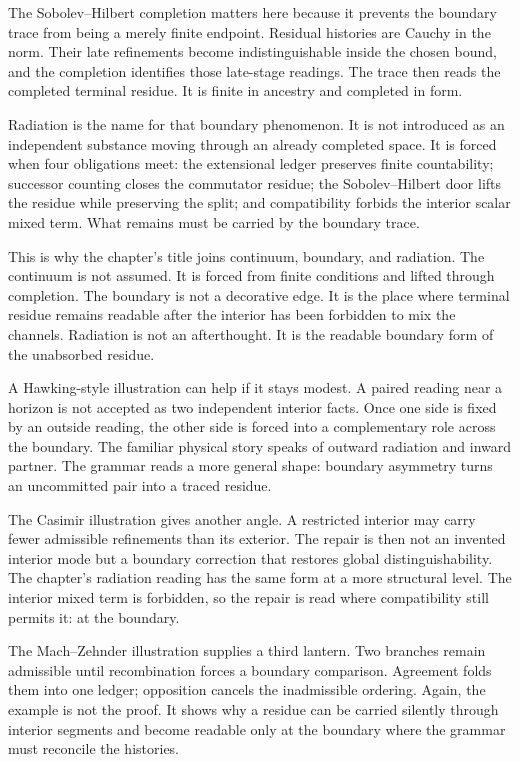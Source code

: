 The Sobolev--Hilbert completion matters here because it prevents the boundary
trace from being a merely finite endpoint. Residual histories are Cauchy in
the norm. Their late refinements become indistinguishable inside the chosen
bound, and the completion identifies those late-stage readings. The trace
then reads the completed terminal residue. It is finite in ancestry and
completed in form.

Radiation is the name for that boundary phenomenon. It is not introduced as
an independent substance moving through an already completed space. It is
forced when four obligations meet: the extensional ledger preserves finite
countability; successor counting closes the commutator residue; the
Sobolev--Hilbert door lifts the residue while preserving the split; and
compatibility forbids the interior scalar mixed term. What remains must be
carried by the boundary trace.

This is why the chapter's title joins continuum, boundary, and radiation.
The continuum is not assumed. It is forced from finite conditions and lifted
through completion. The boundary is not a decorative edge. It is the place
where terminal residue remains readable after the interior has been
forbidden to mix the channels. Radiation is not an afterthought. It is the
readable boundary form of the unabsorbed residue.

A Hawking-style illustration can help if it stays modest. A paired reading
near a horizon is not accepted as two independent interior facts. Once one
side is fixed by an outside reading, the other side is forced into a
complementary role across the boundary. The familiar physical story speaks
of outward radiation and inward partner. The grammar reads a more general
shape: boundary asymmetry turns an uncommitted pair into a traced residue.

The Casimir illustration gives another angle. A restricted interior may
carry fewer admissible refinements than its exterior. The repair is then not
an invented interior mode but a boundary correction that restores global
distinguishability. The chapter's radiation reading has the same form at a
more structural level. The interior mixed term is forbidden, so the repair
is read where compatibility still permits it: at the boundary.

The Mach--Zehnder illustration supplies a third lantern. Two branches remain
admissible until recombination forces a boundary comparison. Agreement
folds them into one ledger; opposition cancels the inadmissible ordering.
Again, the example is not the proof. It shows why a residue can be carried
silently through interior segments and become readable only at the boundary
where the grammar must reconcile the histories.

